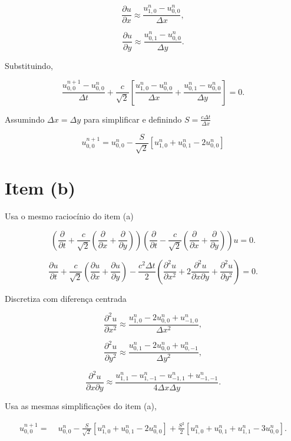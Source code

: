 \[
\frac{\partial u}{\partial x}
\approx
\frac{
u_{1,0}^{n}
-
u_{0,0}^{n}
}{\Delta x},
\]

\[
\frac{\partial u}{\partial y}
\approx
\frac{
u_{0,1}^{n}
-
u_{0,0}^{n}
}{\Delta y}.
\]

Substituindo,

\[
\frac{
u_{0,0}^{n+1}
-
u_{0,0}^{n}
}{\Delta t}
+
\frac{c}{\sqrt{2}}
\left[
\frac{
u_{1,0}^{n}
-
u_{0,0}^{n}
}{\Delta x}
+
\frac{
u_{0,1}^{n}
-
u_{0,0}^{n}
}{\Delta y}
\right]
=0.
\]

Assumindo $\Delta x = \Delta y$ para simplificar e definindo $S = \frac{c\Delta t}{\Delta x}$

\[
\boxed{
u_{0,0}^{n+1}
=
u_{0,0}^{n}
-
\frac{S}{\sqrt{2}}
\left[
u_{1,0}^{n}
+
u_{0,1}^{n}
-
2u_{0,0}^{n}
\right]
}
\]


\section {Item (b)}

Usa o mesmo raciocínio do item (a)

\[
\left(
\frac{\partial}{\partial t}
+
\frac{c}{\sqrt{2}}
\left(
\frac{\partial}{\partial x}
+
\frac{\partial}{\partial y}
\right)
\right)
\left(
\frac{\partial}{\partial t}
-
\frac{c}{\sqrt{2}}
\left(
\frac{\partial}{\partial x}
+
\frac{\partial}{\partial y}
\right)
\right)
u = 0.
\]

\[
\frac{\partial u}{\partial t}
+
\frac{c}{\sqrt{2}}
\left(
\frac{\partial u}{\partial x}
+
\frac{\partial u}{\partial y}
\right)
-
\frac{c^2\Delta t}{2}
\left(
\frac{\partial^2 u}{\partial x^2}
+
2\frac{\partial^2 u}{\partial x\partial y}
+
\frac{\partial^2 u}{\partial y^2}
\right)
=0.
\]

Discretiza com diferença centrada

\[
\frac{\partial^2 u}{\partial x^2}
\approx
\frac{
u_{1,0}^{n}
-
2u_{0,0}^{n}
+
u_{-1,0}^{n}
}{\Delta x^2},
\]

\[
\frac{\partial^2 u}{\partial y^2}
\approx
\frac{
u_{0,1}^{n}
-
2u_{0,0}^{n}
+
u_{0,-1}^{n}
}{\Delta y^2},
\]

\[
\frac{\partial^2 u}{\partial x\partial y}
\approx
\frac{
u_{1,1}^{n}
-
u_{1,-1}^{n}
-
u_{-1,1}^{n}
+
u_{-1,-1}^{n}
}{4\Delta x\Delta y}.
\]

Usa as mesmas simplificações do item (a),


\[
\boxed{
\begin{aligned}
u_{0,0}^{n+1}
=
&\;
u_{0,0}^{n}
-
\frac{S}{\sqrt{2}}
\left[
u_{1,0}^{n}
+
u_{0,1}^{n}
-
2u_{0,0}^{n}
\right]
+
\frac{S^2}{2}
\left[
u_{1,0}^{n}
+
u_{0,1}^{n}
+
u_{1,1}^{n}
-
3u_{0,0}^{n}
\right].
\end{aligned}
}
\]

